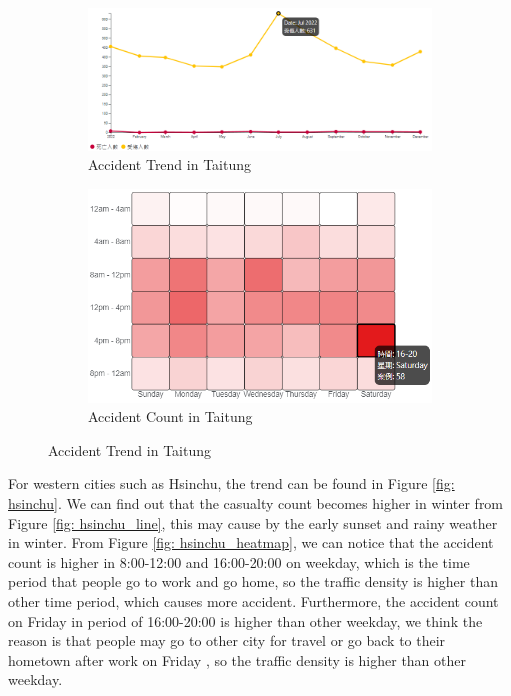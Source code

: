 \documentclass[a4paper, oneside, final, 12pt]{scrartcl} %
\begin{document}
\begin{figure}[htbp]
  \centering
  \begin{subfigure}[b]{0.6\textwidth}
      \includegraphics[width=\textwidth]{"./Image/eastern_line.png"}
      \caption{Accident Trend in Taitung}
      \label{fig: taitung_line}
  \end{subfigure}
  \begin{subfigure}[b]{0.35\textwidth}
      \includegraphics[width=\textwidth]{"./Image/eastern_heatmap.png"}
      \caption{Accident Count in Taitung}
      \label{fig: taitung_heatmap}
  \end{subfigure}
  \caption{Accident Trend in Taitung}
  \label{fig: taitung}
\end{figure}

For western cities such as Hsinchu,
the trend can be found in Figure \ref{fig: hsinchu}.
We can find out that the casualty count becomes 
higher in winter from Figure \ref{fig: hsinchu_line},
this may cause by the early sunset and rainy weather in winter.
From Figure \ref{fig: hsinchu_heatmap}, we can notice that
the accident count is higher in 8:00-12:00 and 16:00-20:00 on weekday,
which is the time period that people go to work and go home,
so the traffic density is higher than other time period,
which causes more accident.
Furthermore, the accident count on Friday in period of 16:00-20:00
is higher than other weekday, we think the reason is that
people may go to other city for travel or go back to their hometown
after work on Friday
, so the traffic density is higher than other weekday.
\end{document}
